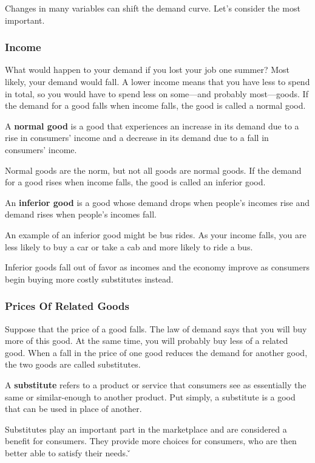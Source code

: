 
Changes in many variables can shift the demand curve. Let's consider the most important.

\subsubsection*{Income}

What would happen to your demand if you lost your job one summer? Most likely, your demand would fall. A lower income
means that you have less to spend in total, so you would have to spend less on some—and probably most—goods. If the
demand for a good falls when income falls, the good is called a normal good.

A \textbf{normal good} is a good that experiences an increase in its demand due to a rise in consumers' income and a
decrease in its demand due to a fall in consumers' income.
\ed

Normal goods are the norm, but not all goods are normal goods. If the demand for a good rises when income falls, the
good is called an inferior good.

An \textbf{inferior good} is a good whose demand drops when people's incomes rise and demand rises when people's incomes
fall.
\ed

\be
An example of an inferior good might be bus rides. As your income falls, you are less likely to buy a car or take a cab
and more likely to ride a bus.
\ee

Inferior goods fall out of favor as incomes and the economy improve as consumers begin buying more costly substitutes
instead.

\subsubsection*{Prices Of Related Goods}

Suppose that the price of a good falls. The law of demand says that you will buy more of this good. At the same time,
you will probably buy less of a related good. When a fall in the price of one good reduces the demand for another
good, the two goods are called substitutes.

\bd[Substitute]
A \textbf{substitute} refers
to a product or service that consumers see as essentially the same or similar-enough to another product. Put simply, a
substitute is a good that can be used in place of another.
\ed

Substitutes play an important part in the marketplace and are considered a benefit for consumers. They provide more
choices for consumers, who are then better able to satisfy their needs. \v

